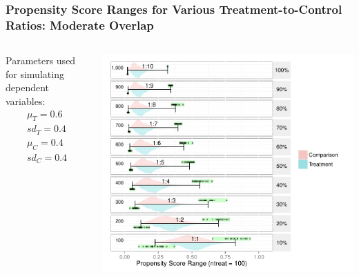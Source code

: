 \documentclass[10pt,handout,mathserif]{beamer}
\begin{document}
\begin{frame}[c]
	\frametitle{Propensity Score Ranges for Various Treatment-to-Control Ratios: Moderate Overlap}
	\begin{columns}
    \begin{column}{0.15\textwidth}
        Parameters used for simulating dependent variables:
    	\begin{equation*}
    	\begin{split}
    	\mu_T = 0.6\\
    	sd_T = 0.4\\
    	\mu_C = 0.4\\
    	sd_C = 0.4
    	\end{split}
    	\end{equation*}
    \end{column}
    \begin{column}{0.85\textwidth}
    	\begin{center}
    	\includegraphics[height=\textheight,keepaspectratio]{../Figures2009/PSRanges}
    	\end{center}
	\end{column}
	\end{columns}
\end{frame}
\end{document}
